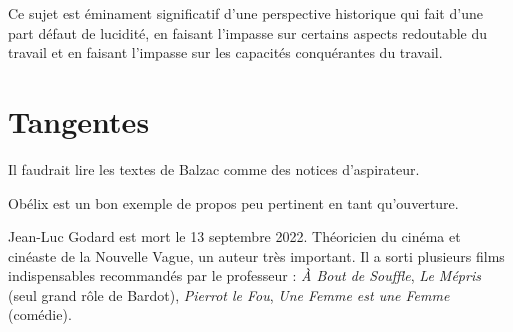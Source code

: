 \documentclass[a4paper,12pt]{book}
\begin{document}
Ce sujet est éminament significatif d'une perspective historique qui fait d'une part défaut de lucidité, en faisant l'impasse sur certains aspects redoutable du travail et en faisant l'impasse sur les capacités conquérantes du travail.







\chapter{Tangentes}
Il faudrait lire les textes de Balzac comme des notices d'aspirateur.
\par Obélix est un bon exemple de propos peu pertinent en tant qu'ouverture.
\par Jean-Luc Godard est mort le 13 septembre 2022. Théoricien du cinéma et cinéaste de la Nouvelle Vague, un auteur très important. Il a sorti plusieurs films indispensables recommandés par le professeur : \textit{À Bout de Souffle}, \textit{Le Mépris} (seul grand rôle de Bardot), \textit{Pierrot le Fou}, \textit{Une Femme est une Femme} (comédie).
\end{document}
